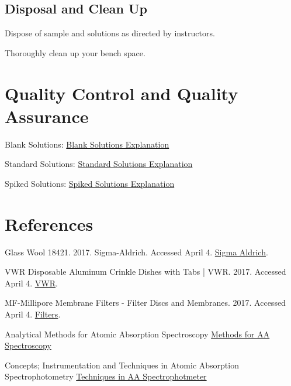\documentclass[12pt]{../SOP3_beta}\usepackage[]{graphicx}\usepackage[]{color}
\begin{document}
\subsection {Disposal and Clean Up}

\NP Dispose of sample and solutions as directed by instructors. 

\NP Thoroughly clean up your bench space.



\section{Quality Control and Quality Assurance}

\NP Blank Solutions: \href{https://en.wikipedia.org/wiki/Blank_(solution)}{Blank Solutions Explanation}

\NP Standard Solutions: \href{https://en.wikipedia.org/wiki/Standard_solution}{Standard Solutions Explanation}

\NP Spiked Solutions: \href{}{Spiked Solutions Explanation}



\section{References}



\NP Glass Wool 18421. 2017. Sigma-Aldrich. Accessed April 4. \href{http://www.sigmaaldrich.com/catalog/product/sial/18421}{Sigma Aldrich}.

\NP VWR Disposable Aluminum Crinkle Dishes with Tabs | VWR. 2017. Accessed April 4. \href{https://us.vwr.com/store/catalog/product.jsp?product_id=4622693}{VWR}.

\NP MF-Millipore Membrane Filters - Filter Discs and Membranes. 2017. Accessed April 4. \href{https://www.emdmillipore.com/US/en/product/MF-Millipore%E2%84%A2-Membrane-Filters,MM_NF-C152}{Filters}.

\NP Analytical Methods for Atomic Absorption Spectroscopy \href{http://www1.lasalle.edu/~prushan/Intrumental%20Analysis_files/AA-Perkin%20Elmer%20guide%20to%20all!.pdf}{Methods for AA Spectroscopy}

\NP Concepts; Instrumentation and Techniques in Atomic Absorption Spectrophotometry \href{http://www.ufjf.br/baccan/files/2011/05/AAS-Perkin1.pdf}{Techniques in AA Spectrophotmeter}
\end{document}
